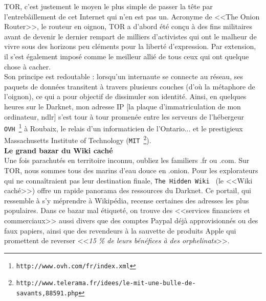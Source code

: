\documentclass[11pt,twoside,a4paper]{article}
\begin{document}
TOR, c'est justement le moyen le plus simple de passer la t{\^e}te par l'entreb{\^a}illement de cet Internet qui n'en est pas un. Acronyme de <<The Onion Router>>, le routeur en oignon, TOR a d'abord {\'e}t{\'e} con\c{c}u {\`a} des fins militaires avant de devenir le dernier rempart de milliers d'activistes qui ont le malheur de vivre sous des horizons peu cl{\'e}ments pour la libert{\'e} d'expression. Par extension, il s'est {\'e}galement impos{\'e} comme le meilleur alli{\'e} de tous ceux qui ont quelque chose {\`a} cacher. ~\\

Son principe est redoutable : lorsqu'un internaute se connecte au r{\'e}seau, ses paquets de donn{\'e}es transitent {\`a} travers plusieurs couches (d'o{\`u} la m{\'e}taphore de l'oignon), ce qui a pour objectif de dissimuler son identit{\'e}. Ainsi, en quelques heures sur le Darknet, mon adresse IP [la plaque d'immatriculation de mon ordinateur, ndlr] s'est tour {\`a} tour promen{\'e}e entre les serveurs de l'h{\'e}bergeur \texttt{OVH~\footnote{\texttt{http://www.ovh.com/fr/index.xml}}} {\`a} Roubaix, le relais d'un informaticien de l'Ontario... et le prestigieux Massachusetts Institute of Technology (\texttt{MIT~\footnote{\texttt{http://www.telerama.fr/idees/le-mit-une-bulle-de-savants,88591.php}}}). ~\\

	\textbf{\large Le grand bazar du Wiki cach{\'e}}~\\

	Une fois parachut{\'e}s en territoire inconnu, oubliez les familiers .fr ou .com. Sur TOR, nous sommes tous des marins d'eau douce en .onion. Pour les explorateurs qui ne conna{\^i}traient pas leur destination finale, \texttt{The Hidden Wiki~\footnotemark } (le <<Wiki cach{\'e}>>) offre un rapide panorama des ressources du Darknet. Ce portail, qui ressemble {\`a} s'y m{\'e}prendre {\`a} Wikip{\'e}dia, recense certaines des adresses les plus populaires. Dans ce bazar mal {\'e}tiquet{\'e}, on trouve des <<services financiers et commerciaux>> aussi divers que des comptes Paypal d{\'e}j{\`a} approvisionn{\'e}s ou des faux papiers, ainsi que des revendeurs {\`a} la sauvette de produits Apple qui promettent de reverser <<\emph{15 \% de leurs b{\'e}n{\'e}fices {\`a} des orphelinats}>>. ~\\
\end{document}
